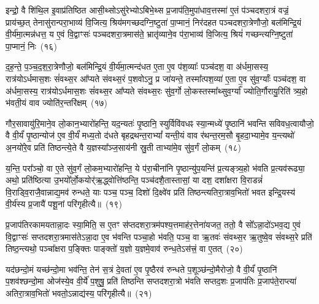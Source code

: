 {\anuvakamend[{अ॒न्तरि॑क्षमिन्द्रि॒यस्यैक॑ञ्च}]}%

इन्द्रो॒ वै शि॑थि॒ल इ॒वाप्र॑तिष्ठित आसी॒थ्सो\-ऽसु॑रेभ्यो\-ऽबिभे॒थ्स प्र॒जा\-प॑ति॒मुपा॑धाव॒त्तस्मा॑ ए॒तं प॑ञ्चदशरा॒त्रं वज्रं॒ प्राय॑च्छ॒त् तेनासु॑रान्परा॒भाव्य॑ वि॒जित्य॒ श्रिय॑मगच्छदग्नि॒ष्टुता॑ पा॒प्मानं॒ निर॑दहत पञ्चदशरा॒त्रेणौजो॒ बल॑मिन्द्रि॒यं वी॒र्य॑मा॒त्मन्न॑धत्त॒ य ए॒वं वि॒द्वाꣳसः॑ पञ्चदशरा॒त्रमास॑ते॒ भ्रातृ॑व्याने॒व प॑रा॒भाव्य॑ वि॒जित्य॒ श्रियं॑ गच्छन्त्यग्नि॒ष्टुता॑ पा॒प्मानं॒ निः~(१६)

द॒ह॒न्ते॒ प॒ञ्च॒द॒श॒रा॒त्रेणौजो॒ बल॑मिन्द्रि॒यं वी॒र्य॑मा॒त्मन्द॑धत ए॒ता ए॒व प॑श॒व्याः᳚ पञ्च॑दश॒ वा अ॑र्धमा॒सस्य॒ रात्र॑यो\-ऽ\-र्धमास॒शः सं॑वथ्स॒र आ᳚प्यते संवथ्स॒रं प॒शवो\-ऽनु॒ प्र जा॑यन्ते॒ तस्मा᳚त्पश॒व्या॑ ए॒ता ए॒व सु॑व॒र्ग्याः᳚ पञ्च॑दश॒ वा अ॑र्धमा॒सस्य॒ रात्र॑यो\-ऽर्धमास॒शः सं॑वथ्स॒र आ᳚प्यते संवथ्स॒रः सु॑व॒र्गो लो॒कस्तस्मा᳚थ्सुव॒र्ग्या᳚ ज्योति॒र्गौरायु॒रिति॑ त्र्य॒हो भ॑वती॒यं वाव ज्योति॑र॒न्तरि॑क्षम्~(१७)

गौर॒सावायु॑रि॒माने॒व लो॒कान॒भ्यारो॑हन्ति॒ यद॒न्यतः॑ पृ॒ष्ठानि॒ स्युर्विवि॑वधꣴ स्या॒न्मध्ये॑ पृ॒ष्ठानि॑ भवन्ति सविवध॒त्वायौजो॒ वै वी॒र्यं॑ पृ॒ष्ठान्योज॑ ए॒व वी॒र्यं॑ मध्य॒तो द॑धते बृहद्रथन्त॒रा\-भ्यां᳚ यन्ती॒यं वाव र॑थन्त॒रम॒सौ बृ॒हदा॒भ्यामे॒व य॒न्त्यथो॑ अ॒नयो॑रे॒व प्रति॑ तिष्ठन्त्ये॒ते वै य॒ज्ञस्या᳚ञ्ज॒साय॑नी स्रु॒ती ताभ्या॑मे॒व सु॑व॒र्गं लो॒कम्~(१८)

य॒न्ति॒ परा᳚ञ्चो॒ वा ए॒ते सु॑व॒र्गं लो॒कम॒भ्यारो॑हन्ति॒ ये प॑रा॒चीना॑नि पृ॒ष्ठान्यु॑प॒यन्ति॑ प्र॒त्यङ्त्र्य॒हो भ॑वति प्र॒त्यव॑रूढ्या॒ अथो॒ प्रति॑ष्ठित्या उ॒भयो᳚र्लो॒कयोर्॑ऋ॒द्ध्वोत्ति॑ष्ठन्ति॒ पञ्च॑दशै॒तास्तासां॒ या दश॒ दशा᳚क्षरा वि॒राडन्नं॑ वि॒राड्वि॒राजै॒वान्नाद्य॒\-मव॑ रुन्धते॒ याः पञ्च॒ पञ्च॒ दिशो॑ दि॒क्ष्वे॑व प्रति॑ तिष्ठन्त्यतिरा॒त्राव॒भितो॑ भवत इन्द्रि॒यस्य॑ वी॒र्य॑स्य प्र॒जायै॑ पशू॒नां परि॑गृहीत्यै॥~(१९)

{\anuvakamend[{ग॒च्छ॒न्त्य॒ग्नि॒ष्टुता॑ पा॒प्मान॒न्निर॒न्तरि॑क्षं लो॒कं प्र॒जायै॒ द्वे च॑}]}%

प्र॒जा\-प॑तिरकामयतान्ना॒दः स्या॒मिति॒ स ए॒तꣳ स॑प्तदशरा॒त्रम॑पश्य॒त्तमाह॑र॒त्तेना॑यजत॒ ततो॒ वै सो᳚\-ऽन्ना॒दो॑\-ऽभव॒द्य ए॒वं वि॒द्वाꣳसः॑ सप्तदशरा॒त्रमास॑ते\-ऽन्ना॒दा ए॒व भ॑वन्ति पञ्चा॒हो भ॑वति॒ पञ्च॒ वा ऋ॒तवः॑ संवथ्स॒र ऋ॒तुष्वे॒व सं॑वथ्स॒रे प्रति॑ तिष्ठ॒न्त्यथो॒ पञ्चा᳚क्षरा प॒ङ्क्तिः पाङ्क्तो॑ य॒ज्ञो य॒ज्ञमे॒वाव॑ रुन्ध॒ते\-ऽस॑त्त्रं॒ वा ए॒तत्~(२०)

यद॑छन्दो॒मं यच्छ॑न्दो॒मा भव॑न्ति॒ तेन॑ स॒त्रं दे॒वता॑ ए॒व पृ॒ष्ठैरव॑ रुन्धते प॒शूञ्छ॑न्दो॒मैरोजो॒ वै वी॒र्यं॑ पृ॒ष्ठानि॑ प॒शव॑श्छन्दो॒मा ओज॑स्ये॒व वी॒र्ये॑ प॒शुषु॒ प्रति॑ तिष्ठन्ति सप्तदशरा॒त्रो भ॑वति सप्तद॒शः प्र॒जा\-प॑तिः प्र॒जा\-प॑ते॒राप्त्या॑ अतिरा॒त्राव॒भितो॑ भवतो॒\-ऽन्नाद्य॑स्य॒ परि॑गृहीत्यै॥~(२१)

